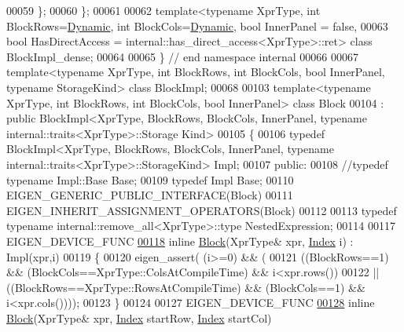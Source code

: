 \begin{DoxyCode}
00059   \};
00060 \};
00061 
00062 \textcolor{keyword}{template}<\textcolor{keyword}{typename} XprType, \textcolor{keywordtype}{int} BlockRows=\hyperlink{namespace_eigen_ad81fa7195215a0ce30017dfac309f0b2}{Dynamic}, \textcolor{keywordtype}{int} BlockCols=\hyperlink{namespace_eigen_ad81fa7195215a0ce30017dfac309f0b2}{Dynamic}, \textcolor{keywordtype}{bool} InnerPanel = \textcolor{keyword}{
      false},
00063          \textcolor{keywordtype}{bool} HasDirectAccess = internal::has\_direct\_access<XprType>::ret> \textcolor{keyword}{class }BlockImpl\_dense;
00064          
00065 \} \textcolor{comment}{// end namespace internal}
00066 
00067 \textcolor{keyword}{template}<\textcolor{keyword}{typename} XprType, \textcolor{keywordtype}{int} BlockRows, \textcolor{keywordtype}{int} BlockCols, \textcolor{keywordtype}{bool} InnerPanel, \textcolor{keyword}{typename} StorageKind> \textcolor{keyword}{class }
      BlockImpl;
00068 
00103 \textcolor{keyword}{template}<\textcolor{keyword}{typename} XprType, \textcolor{keywordtype}{int} BlockRows, \textcolor{keywordtype}{int} BlockCols, \textcolor{keywordtype}{bool} InnerPanel> \textcolor{keyword}{class }Block
00104   : \textcolor{keyword}{public} BlockImpl<XprType, BlockRows, BlockCols, InnerPanel, typename internal::traits<XprType>::Storage
      Kind>
00105 \{
00106     \textcolor{keyword}{typedef} BlockImpl<XprType, BlockRows, BlockCols, InnerPanel, typename
       internal::traits<XprType>::StorageKind> Impl;
00107   \textcolor{keyword}{public}:
00108     \textcolor{comment}{//typedef typename Impl::Base Base;}
00109     \textcolor{keyword}{typedef} Impl Base;
00110     EIGEN\_GENERIC\_PUBLIC\_INTERFACE(Block)
00111     EIGEN\_INHERIT\_ASSIGNMENT\_OPERATORS(Block)
00112     
00113     \textcolor{keyword}{typedef} \textcolor{keyword}{typename} internal::remove\_all<XprType>::type NestedExpression;
00114   
00117     EIGEN\_DEVICE\_FUNC
\hyperlink{group___core___module_ab45272f7223731c9a61937e55795c728}{00118}     \textcolor{keyword}{inline} \hyperlink{group___core___module_ab45272f7223731c9a61937e55795c728}{Block}(XprType& xpr, \hyperlink{namespace_eigen_a62e77e0933482dafde8fe197d9a2cfde}{Index} i) : Impl(xpr,i)
00119     \{
00120       eigen\_assert( (i>=0) && (
00121           ((BlockRows==1) && (BlockCols==XprType::ColsAtCompileTime) && i<xpr.rows())
00122         ||((BlockRows==XprType::RowsAtCompileTime) && (BlockCols==1) && i<xpr.cols())));
00123     \}
00124 
00127     EIGEN\_DEVICE\_FUNC
\hyperlink{group___core___module_afdf396b628ef3874414bbfc4ebd72ab4}{00128}     \textcolor{keyword}{inline} \hyperlink{group___core___module_afdf396b628ef3874414bbfc4ebd72ab4}{Block}(XprType& xpr, \hyperlink{namespace_eigen_a62e77e0933482dafde8fe197d9a2cfde}{Index} startRow, \hyperlink{namespace_eigen_a62e77e0933482dafde8fe197d9a2cfde}{Index} startCol)

\end{DoxyCode}
